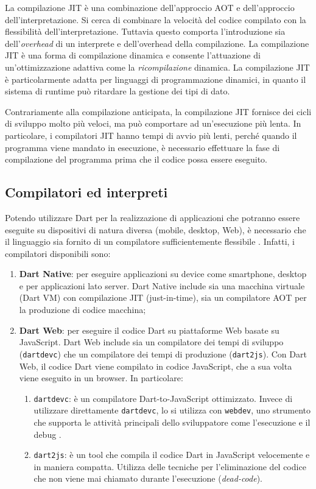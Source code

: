 La compilazione JIT è una combinazione dell'approccio AOT e dell'approccio dell'interpretazione.  Si cerca di combinare la velocità del codice compilato con la flessibilità dell'interpretazione. Tuttavia questo comporta l'introduzione sia dell'\textit{overhead} di un interprete e dell'overhead della compilazione. La compilazione JIT è una forma di compilazione dinamica e consente l'attuazione di un'ottimizzazione adattiva come la \textit{ricompilazione} dinamica. La compilazione JIT è particolarmente adatta per linguaggi di programmazione dinamici, in quanto il sistema di runtime può ritardare la gestione dei tipi di dato.

Contrariamente alla compilazione anticipata, la compilazione JIT fornisce dei cicli di sviluppo molto più veloci, ma può comportare ad un'esecuzione più lenta. In particolare, i compilatori JIT hanno tempi di avvio più lenti, perché quando il programma viene mandato in esecuzione, è necessario effettuare la fase di compilazione del programma prima che il codice possa essere eseguito.

\subsection{Compilatori ed interpreti}
Potendo utilizzare Dart per la realizzazione di applicazioni che potranno essere eseguite su dispositivi di natura diversa (mobile, desktop, Web), è necessario che il linguaggio sia fornito di un compilatore sufficientemente flessibile \cite{compilazione_dart}. Infatti, i compilatori disponibili sono:
\begin{enumerate}
	\item \textbf{Dart Native}: per eseguire applicazioni su device come smartphone, desktop e per applicazioni lato server. Dart Native include sia una macchina virtuale (Dart VM) con compilazione JIT (just-in-time), sia un compilatore AOT per la produzione di codice macchina;
	\item \textbf{Dart Web}:  per eseguire il codice Dart su piattaforme Web basate su JavaScript. Dart Web include sia un compilatore dei tempi di sviluppo (\verb|dartdevc|) che un compilatore dei tempi di produzione (\verb|dart2js|). Con Dart Web, il codice Dart viene compilato in codice JavaScript, che a sua volta viene eseguito in un browser. In particolare:
	\begin{enumerate}
		\item \verb|dartdevc|: è un compilatore Dart-to-JavaScript ottimizzato. Invece di utilizzare direttamente \verb|dartdevc|, lo si utilizza con \verb|webdev|, uno strumento che supporta le attività principali dello sviluppatore come l'esecuzione e il debug \cite{dartdevc}.
		\item \verb|dart2js|: è un tool che compila il codice Dart in JavaScript velocemente e in maniera compatta. Utilizza delle tecniche per l'eliminazione del codice che non viene mai chiamato durante l'esecuzione (\textit{dead-code}).
	\end{enumerate}
\end{enumerate}

